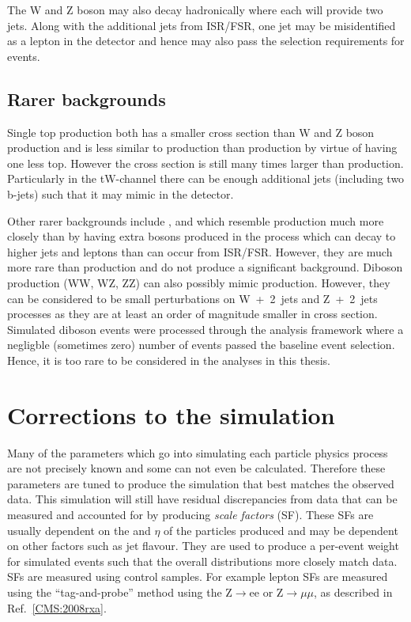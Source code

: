 The W and Z boson may also decay hadronically where each will provide two jets. Along with the additional jets from ISR/FSR, one jet may be misidentified as a lepton in the detector and hence may also pass the selection requirements for \tttt events.

\subsection{Rarer backgrounds}
Single top production both has a smaller cross section than W and Z boson production and is less similar to \tttt production than \ttbar production by virtue of having one less top. However the cross section is still many times larger than \tttt production. Particularly in the tW-channel there can be enough additional jets (including two b-jets) such that it may mimic \tttt in the detector.


Other rarer backgrounds include \ttH, \ttZ and \ttW which resemble \tttt production much more closely than \ttbar by having extra bosons produced in the process which can decay to higher \pt jets and leptons than can occur from ISR/FSR. However, they are much more rare than \ttbar production and do not produce a significant background. Diboson production (WW, WZ, ZZ) can also possibly mimic \tttt production. However, they can be considered to be small perturbations on W~+~2~jets and Z~+~2~jets processes as they are at least an order of magnitude smaller in cross section. Simulated diboson events were processed through the analysis framework where a negligble (sometimes zero) number of events passed the baseline event selection. Hence, it is too rare to be considered in the analyses in this thesis.


\section{Corrections to the simulation}
\label{sec:Calibrations}
Many of the parameters which go into simulating each particle physics process are not precisely known and some can not even be calculated. Therefore these parameters are tuned to produce the simulation that best matches the observed data. This simulation will still have residual discrepancies from data that can be measured and accounted for by producing \emph{scale factors} (SF). These SFs are usually dependent on the \pt and $\eta$ of the particles produced and may be dependent on other factors such as jet flavour. They are used to produce a per-event weight for simulated events such that the overall distributions more closely match data. 
SFs are measured using control samples. For example lepton SFs are measured using the ``tag-and-probe'' method using the Z$\rightarrow$ee or Z$\rightarrow \mu \mu$, as described in Ref.~\ref{CMS:2008rxa}.

